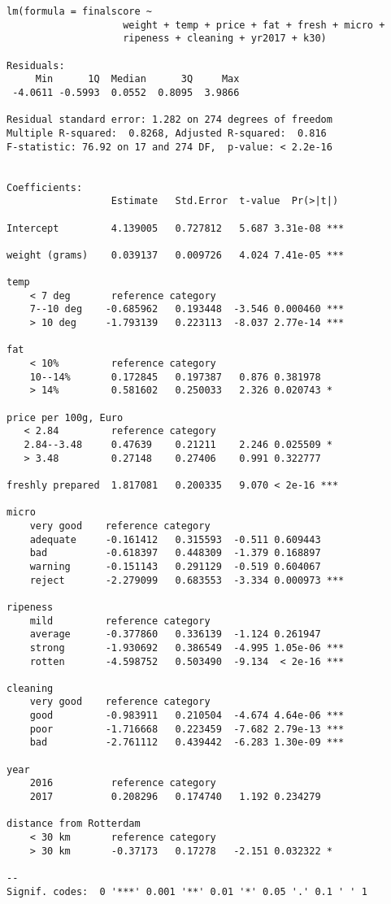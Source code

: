\documentclass[alpha-refs]{wiley-article}
\begin{document}
{
\begin{lstlisting}
lm(formula = finalscore ~ 
                    weight + temp + price + fat + fresh + micro + 
                    ripeness + cleaning + yr2017 + k30)
 
Residuals:
     Min      1Q  Median      3Q     Max 
 -4.0611 -0.5993  0.0552  0.8095  3.9866

Residual standard error: 1.282 on 274 degrees of freedom
Multiple R-squared:  0.8268, Adjusted R-squared:  0.816 
F-statistic: 76.92 on 17 and 274 DF,  p-value: < 2.2e-16


Coefficients:
                  Estimate   Std.Error  t-value  Pr(>|t|)
                              
Intercept         4.139005   0.727812   5.687 3.31e-08 ***

weight (grams)    0.039137   0.009726   4.024 7.41e-05 ***
 
temp
    < 7 deg       reference category
    7--10 deg    -0.685962   0.193448  -3.546 0.000460 ***
    > 10 deg     -1.793139   0.223113  -8.037 2.77e-14 ***
 
fat
    < 10%         reference category
    10--14%       0.172845   0.197387   0.876 0.381978    
    > 14%         0.581602   0.250033   2.326 0.020743 *  
    
price per 100g, Euro
   < 2.84         reference category
   2.84--3.48     0.47639    0.21211    2.246 0.025509 *  
   > 3.48         0.27148    0.27406    0.991 0.322777   
 
freshly prepared  1.817081   0.200335   9.070 < 2e-16 ***
 
micro
    very good    reference category
    adequate     -0.161412   0.315593  -0.511 0.609443    
    bad          -0.618397   0.448309  -1.379 0.168897    
    warning      -0.151143   0.291129  -0.519 0.604067    
    reject       -2.279099   0.683553  -3.334 0.000973 ***
 
ripeness
    mild         reference category
    average      -0.377860   0.336139  -1.124 0.261947    
    strong       -1.930692   0.386549  -4.995 1.05e-06 ***
    rotten       -4.598752   0.503490  -9.134  < 2e-16 ***
 
cleaning
    very good    reference category
    good         -0.983911   0.210504  -4.674 4.64e-06 ***
    poor         -1.716668   0.223459  -7.682 2.79e-13 ***
    bad          -2.761112   0.439442  -6.283 1.30e-09 ***

year
    2016          reference category
    2017          0.208296   0.174740   1.192 0.234279

distance from Rotterdam
    < 30 km       reference category
    > 30 km       -0.37173   0.17278   -2.151 0.032322 *  
     
--
Signif. codes:  0 '***' 0.001 '**' 0.01 '*' 0.05 '.' 0.1 ' ' 1
\end{lstlisting}
}
\end{document}
